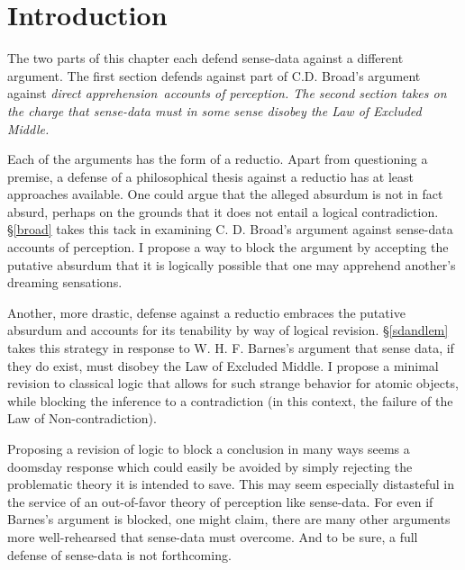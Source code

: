 


%


\section{Introduction}
The two parts of this chapter each defend sense-data against a different argument. The first section defends against part of C.D. Broad's \citeyear{Broad:1952} argument against \em direct apprehension\em\ accounts of perception. The second section takes on the charge that sense-data must in some sense disobey the Law of Excluded Middle. 

Each of the arguments has the form of a reductio. Apart from questioning a premise, a defense of a philosophical thesis against a reductio has at least approaches available. One could argue that the alleged absurdum is not in fact absurd, perhaps on the grounds that it does not entail a logical contradiction. \S\ref{broad} takes this tack in examining C. D. Broad's \citeyear{Broad:1952} argument against sense-data accounts of perception. I propose a way to block the argument by accepting the putative absurdum that it is logically possible that one may apprehend another's dreaming sensations. 

Another, more drastic, defense against a reductio embraces the putative absurdum and accounts for its tenability by way of logical revision. \S\ref{sdandlem} takes this strategy in response to W. H. F. Barnes's \citeyear{Barnes:1944} argument that sense data, if they do exist, must disobey the Law of Excluded Middle. I propose a minimal revision to classical logic that allows for such strange behavior for atomic objects, while blocking the inference to a contradiction (in this context, the failure of the Law of Non-contradiction).

Proposing a revision of logic to block a conclusion in many ways seems a doomsday response which could easily be avoided by simply rejecting the problematic theory it is intended to save. This may seem especially distasteful in the service of an out-of-favor theory of perception like sense-data. For even if Barnes's argument is blocked, one might claim, there are many other arguments more well-rehearsed that sense-data must overcome. And to be sure, a full defense of sense-data is not forthcoming.

